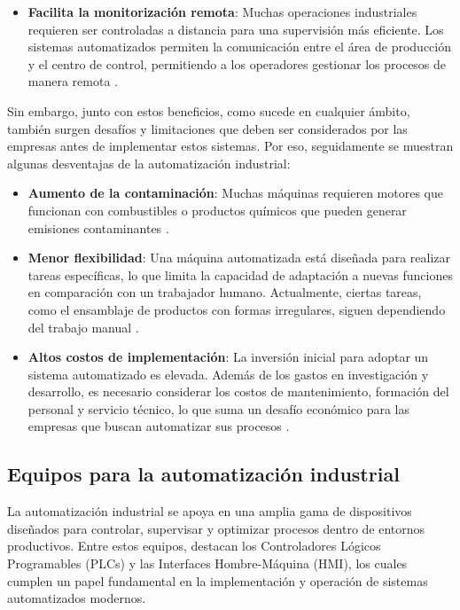 \begin{itemize}
\item \textbf{Facilita la monitorización remota}: Muchas operaciones industriales requieren ser controladas a distancia para una supervisión más eficiente. Los sistemas automatizados permiten la comunicación entre el área de producción y el centro de control, permitiendo a los operadores gestionar los procesos de manera remota \cite{des_ventajas_2}.

\end{itemize}

Sin embargo, junto con estos beneficios, como sucede en cualquier ámbito, también surgen desafíos y limitaciones que deben ser considerados por las empresas antes de implementar estos sistemas. Por eso, seguidamente se muestran algunas desventajas de la automatización industrial:

\begin{itemize}

\item \textbf{Aumento de la contaminación}: Muchas máquinas requieren motores que funcionan con combustibles o productos químicos que pueden generar emisiones contaminantes \cite{des_ventajas_1}.

\item \textbf{Menor flexibilidad}: Una máquina automatizada está diseñada para realizar tareas específicas, lo que limita la capacidad de adaptación a nuevas funciones en comparación con un trabajador humano. Actualmente, ciertas tareas, como el ensamblaje de productos con formas irregulares, siguen dependiendo del trabajo manual \cite{des_ventajas_1}.

\item \textbf{Altos costos de implementación}: La inversión inicial para adoptar un sistema automatizado es elevada. Además de los gastos en investigación y desarrollo, es necesario considerar los costos de mantenimiento, formación del personal y servicio técnico, lo que suma un desafío económico para las empresas que buscan automatizar sus procesos \cite{des_ventajas_2}.
\end{itemize}

\subsection{Equipos para la automatización industrial}

La automatización industrial se apoya en una amplia gama de dispositivos diseñados para controlar, supervisar y optimizar procesos dentro de entornos productivos. Entre estos equipos, destacan los Controladores Lógicos Programables (PLCs) y las Interfaces Hombre-Máquina (HMI), los cuales cumplen un papel fundamental en la implementación y operación de sistemas automatizados modernos.

